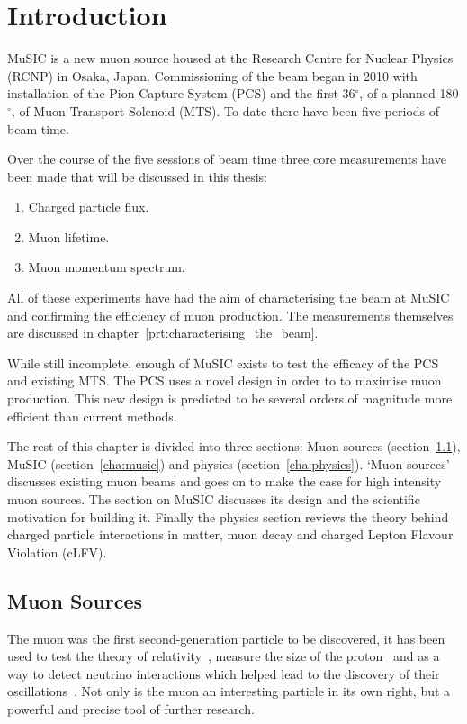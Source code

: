 \chapter{Introduction} %
\label{prt:introduction}
MuSIC is a new muon source housed at the Research Centre for Nuclear Physics (RCNP) in Osaka, Japan. Commissioning of the beam began in 2010 with installation of the Pion Capture System (PCS) and the first 36\(^{\circ}\), of a planned 180\(^{\circ}\), of Muon Transport Solenoid (MTS). To date there have been five periods of beam time.

Over the course of the five sessions of beam time three core measurements have been made that will be discussed in this thesis:
\begin{enumerate}
  \item Charged particle flux.
  \item Muon lifetime.
  \item Muon momentum spectrum.
\end{enumerate}
All of these experiments have had the aim of characterising the beam at MuSIC and confirming the efficiency of muon production. The measurements themselves are discussed in chapter~\ref{prt:characterising_the_beam}.

While still incomplete, enough of MuSIC exists to test the efficacy of the PCS and existing MTS. The PCS uses a novel design in order to to maximise muon production. This new design is predicted to be several orders of magnitude more efficient than current methods.

The rest of this chapter is divided into three sections: Muon sources (section~\ref{cha:high_intensity_muon_sources}), MuSIC (section~\ref{cha:music}) and physics (section~\ref{cha:physics}). `Muon sources' discusses existing muon beams and goes on to make the case for high intensity muon sources. The section on MuSIC discusses its design and the scientific motivation for building it. Finally the physics section reviews the theory behind charged particle interactions in matter, muon decay and charged Lepton Flavour Violation (cLFV).

\section{Muon Sources} %
\label{cha:high_intensity_muon_sources}
The muon was the first second-generation particle to be discovered, it has been used to test the theory of relativity~\cite{rossi_hall_first_muons}, measure the size of the proton~\cite{proton_size} and as a way to detect neutrino interactions which helped lead to the discovery of their oscillations~\cite{t2k_cdr}. Not only is the muon an interesting particle in its own right, but a powerful and precise tool of further research. 


